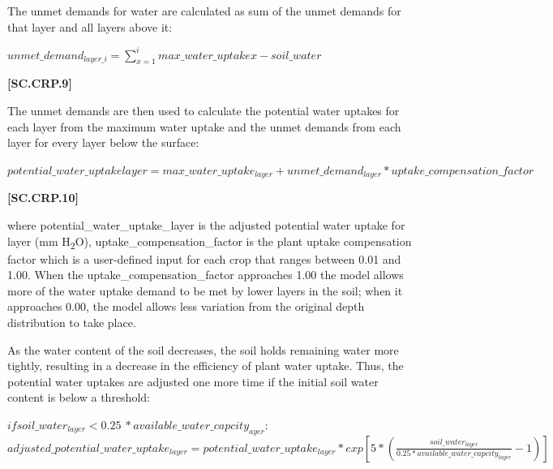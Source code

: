 The unmet demands for water are calculated as sum of the unmet demands for that layer and all layers above it:
    \vspace{0.2cm}

    \begin{center}
        \(unmet\_demand_{layer\_i}=\displaystyle \sum_{x=1}^{i} 
max\_water\_uptakex-soil\_water\)
    \end{center}
        \vspace{0.5cm}
    
            {\raggedleft \textbf{[SC.CRP.9]}\par}
            \vspace{0.5cm}

The unmet demands are then used to calculate the potential water uptakes for each layer from the maximum water uptake and the unmet demands from each layer for every layer below the surface:
    \vspace{0.2cm}

    \begin{center}
        \(potential\_water\_uptakelayer=max\_water\_uptake_{layer}+unmet\_demand_{layer} * uptake\_compensation\_factor\)
    \end{center}
        \vspace{0.5cm}
    
            {\raggedleft \textbf{[SC.CRP.10]}\par}
            \vspace{0.5cm}


where potential\_water\_uptake\_{layer} is the adjusted potential water uptake for layer (mm H\textsubscript{2}O), uptake\_compensation\_factor is the plant uptake compensation factor which is a user-defined input for each crop that ranges between 0.01 and 1.00. When the uptake\_compensation\_factor approaches 1.00 the model allows more of the water uptake demand to be met by lower layers in the soil; when it approaches 0.00, the model allows less variation from the original depth distribution to take place. 

As the water content of the soil decreases, the soil holds remaining water more tightly, resulting in a decrease in the efficiency of plant water uptake. Thus, the potential water uptakes are adjusted one more time if the initial soil water content is below a threshold:
    \vspace{0.2cm}

    \begin{center}
        \(if soil\_water_{layer}<0.25\ * available\_water\_capcity_{ayer}:\) \\ \(adjusted\_potential\_water\_uptake_{layer}=potential\_water\_uptake_{layer} * exp[5* (\frac{soil\_water_{layer}}{0.25 * available\_water\_capcity_{layer}}-1)]\)
    \end{center}
        \vspace{0.5cm}
    
